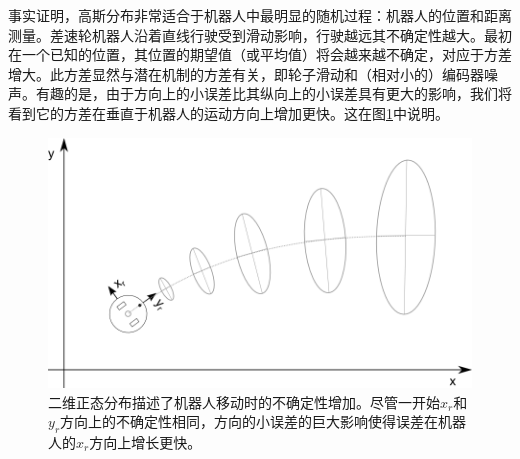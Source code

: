 
事实证明，高斯分布非常适合于机器人中最明显的随机过程：机器人的位置和距离测量。差速轮机器人沿着直线行驶受到滑动影响，行驶越远其不确定性越大。最初在一个已知的位置，其位置的期望值（或平均值）将会越来越不确定，对应于方差增大。此方差显然与潜在机制的方差有关，即轮子滑动和（相对小的）编码器噪声。有趣的是，由于方向上的小误差比其纵向上的小误差具有更大的影响，我们将看到它的方差在垂直于机器人的运动方向上增加更快。这在图\ref{fig:errorprop_odometry}中说明。

\begin{figure}
	\centering
		\includegraphics[width=\textwidth]{figs/errorprop_odometry}
	\caption{二维正态分布描述了机器人移动时的不确定性增加。尽管一开始$x_r$和$y_r$方向上的不确定性相同，方向的小误差的巨大影响使得误差在机器人的$x_r$方向上增长更快。}
	\label{fig:errorprop_odometry}
\end{figure}

